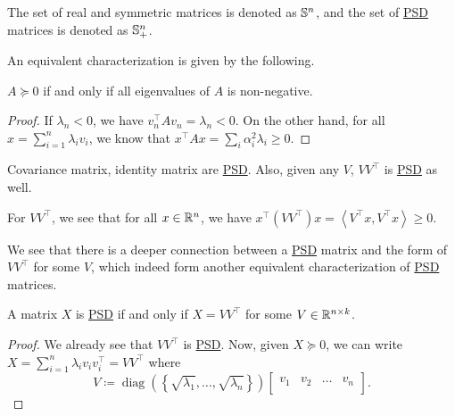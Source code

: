 \begin{notation}
	The set of real and symmetric matrices is denoted as \(\mathbb{\MakeUppercase{s}} ^n\), and the set of \hyperref[def:PSD]{PSD} matrices is denoted as \(\mathbb{\MakeUppercase{s}} ^n_+\).
\end{notation}

An equivalent characterization is given by the following.

\begin{lemma}\label{lma:PSD-non-negative-eigenvalue}
	\(A \succeq 0 \) if and only if all eigenvalues of \(A\) is non-negative.
\end{lemma}
\begin{proof}
	If \(\lambda _n < 0\), we have \(v_n ^{\top} A v_n = \lambda _n < 0\). On the other hand, for all \(x = \sum_{i=1}^n \lambda _i v_i \), we know that \(x^{\top} A x = \sum_{i} \alpha _i ^{2} \lambda _i \geq 0\).
\end{proof}

\begin{eg}
	Covariance matrix, identity matrix are \hyperref[def:PSD]{PSD}. Also, given any \(V\), \(V V^{\top} \) is \hyperref[def:PSD]{PSD} as well.
\end{eg}
\begin{explanation}
	For \(V V^{\top}\), we see that for all \(x\in \mathbb{\MakeUppercase{r}} ^n\), we have \(x^{\top} (V V^{\top} )x = \left\langle V^{\top} x, V^{\top} x \right\rangle \geq 0\).
\end{explanation}

We see that there is a deeper connection between a \hyperref[def:PSD]{PSD} matrix and the form of \(V V^{\top} \) for some \(V\), which indeed form another equivalent characterization of \hyperref[def:PSD]{PSD} matrices.

\begin{lemma}\label{lma:lec14-1}
	A matrix \(X\) is \hyperref[def:PSD]{PSD} if and only if \(X = V V^{\top} \) for some \(V\in \mathbb{\MakeUppercase{r}} ^{n\times k}\).
\end{lemma}
\begin{proof}
	We already see that \(V V^{\top} \) is \hyperref[def:PSD]{PSD}. Now, given \(X \succeq 0\), we can write \(X = \sum_{i=1} ^n \lambda _i v_i v_i ^{\top} = V V^{\top} \) where
	\[
		V\coloneqq \mathop{\mathrm{diag}}\left( \left\{ \sqrt{\lambda _1}, \ldots , \sqrt{\lambda _n} \right\} \right)  \begin{bmatrix}
			v_1 & v_2 & \ldots & v_n \\
		\end{bmatrix}.
	\]
\end{proof}

